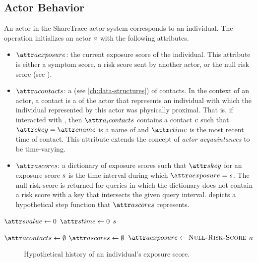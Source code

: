 \subsection{Actor Behavior}

An actor in the ShareTrace actor system corresponds to an individual. The \cCreateActor operation \citep{Agha1985} initializes an actor $a$ with the following attributes.
\begin{itemize}
  \item $\aActorExposure$: the current exposure score of the individual. This attribute is either a symptom score, a risk score sent by another actor, or the null risk score (see \cNullRiskScore).
  \item $\aActorContacts$: a  (see \cref{ch:data-structures}) of contacts. In the context of an actor, a contact is a  \citep{Gamma1995} of the actor that represents an individual with which the individual represented by this actor was physically proximal. That is, if  interacted with , then $\aContacts{\vActor_i}$ contains a contact $c$ such that $\aContactKey = \aContactName$ is a name of  and $\aContactTime$ is the most recent time of contact. This attribute extends the concept of \emph{actor acquaintances} \citep{Hewitt1977a, Hewitt1977b, Agha1985} to be time-varying.
  \item $\aActorScores$: a dictionary of exposure scores such that $\aScoreKey$ for an exposure score $s$ is the time interval during which $\aActorExposure = \vScore$. The null risk score is returned for queries in which the dictionary does not contain a risk score with a key that intersects the given query interval.  depicts a hypothetical step function that $\aActorScores$ represents.
\end{itemize}

\begin{function}[H]{\nNullRiskScore}
  \State $\aScoreValue \assign 0$
  \State $\aScoreTime \assign 0$
  \State \Return $s$
\end{function}

\begin{function}[H]{\nCreateActor}
  \State $\aActorContacts \assign \emptyset$
  \State $\aActorScores \assign \emptyset$
  \State $\aActorExposure \assign \cNullRiskScore$
  \State \Return $a$
\end{function}

\begin{figure}[htbp]
\centering
{}
\caption[Historical exposure scores of an actor]{Hypothetical history of an individual's exposure score.}
\label{fig:exposure}
\end{figure}

